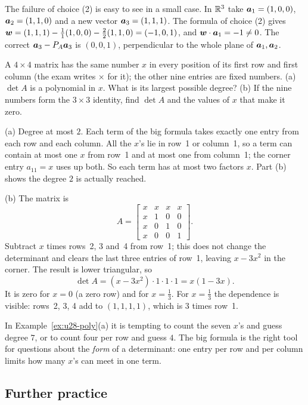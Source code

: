 The failure of choice (2) is easy to see in a small case. In $\mathbb{R}^{3}$ take
$\boldsymbol{a}_1=(1,0,0)$, $\boldsymbol{a}_2=(1,1,0)$ and a new vector $\boldsymbol{a}_3=(1,1,1)$. The formula of
choice (2) gives
$\boldsymbol{w}=(1,1,1)-\tfrac11(1,0,0)-\tfrac22(1,1,0)=(-1,0,1)$, and $\boldsymbol{w}\cdot\boldsymbol{a}_1=-1\neq0$.
The correct $\boldsymbol{a}_3-P_A\boldsymbol{a}_3$ is $(0,0,1)$, perpendicular to the whole plane of
$\boldsymbol{a}_1,\boldsymbol{a}_2$.

\begin{example}\label{ex:u28-poly}
A $4\times4$ matrix has the same number $x$ in every position of its first row and first
column (the exam writes $\times$ for it); the other nine entries are fixed numbers.
(a) $\det A$ is a polynomial in $x$. What is its largest possible degree? (b) If the nine
numbers form the $3\times3$ identity, find $\det A$ and the values of $x$ that make it zero.

(a) Degree at most $2$. Each term of the big formula takes exactly one entry from each row
and each column. All the $x$'s lie in row~1 or column~1, so a term can contain at most one
$x$ from row~1 and at most one from column~1; the corner entry $a_{11}=x$ uses up both. So
each term has at most two factors $x$. Part (b) shows the degree $2$ is actually reached.

(b) The matrix is
\[
  A=\begin{bmatrix} x&x&x&x\\ x&1&0&0\\ x&0&1&0\\ x&0&0&1\end{bmatrix}.
\]
Subtract $x$ times rows~2, 3 and~4 from row~1; this does not change the determinant and
clears the last three entries of row~1, leaving $x-3x^{2}$ in the corner. The result is
lower triangular, so
\[
  \det A=(x-3x^{2})\cdot1\cdot1\cdot1=x(1-3x).
\]
It is zero for $x=0$ (a zero row) and for $x=\tfrac13$. For $x=\tfrac13$ the dependence is
visible: rows~2, 3, 4 add to $(1,1,1,1)$, which is $3$ times row~1.
\end{example}

\begin{trap}
In Example~\ref{ex:u28-poly}(a) it is tempting to count the seven $x$'s and guess degree $7$,
or to count four per row and guess $4$. The big formula is the right tool for questions about
the \emph{form} of a determinant: one entry per row and per column limits how many $x$'s can
meet in one term.
\end{trap}

\subsection{Further practice}

